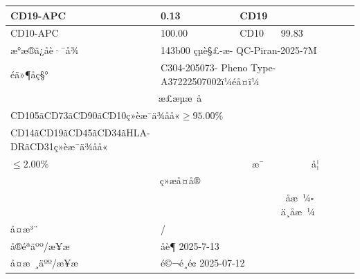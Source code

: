 \documentclass[UTF8,10pt,a4paper,fontset=fandol]{ctexart}
\newcommand{\fieldvalue}[1]{#1}
\newcommand{\handwritten}[1]{#1}
\begin{document}
\begin{tabularx}{\textwidth}{|p{}|X|p{}|X|}
\hline
CD19-APC &
\fieldvalue{\handwritten{0.13}} &
CD19 & \\ \hline
CD10-APC &
\fieldvalue{\handwritten{100.00}} &
CD10 &
\fieldvalue{\handwritten{99.83}} \\ \hline
\multicolumn{1}{|l|}{æ°æ®ä¿å­è·¯å¾} &
\multicolumn{3}{l|}{
\fieldvalue{\handwritten{143b00 çµè§£-æ- QC-Piran-2025-7M}}
} \\ \hline
\multicolumn{1}{|l|}{éä»¶åç§°} &
\multicolumn{3}{l|}{
\fieldvalue{\handwritten{C304-205073- Pheno Type-A37222507002ï¼éå¤ï¼}}
} \\ \hline
\multicolumn{4}{|c|}{æ£æµæ å} \\ \hline
\multicolumn{4}{|l|}{CD105ãCD73ãCD90ãCD10ç»èæ¯ä¾åå«$\geq 95.00\%$} \\ \hline
\multicolumn{2}{|l|}{CD14ãCD19ãCD45ãCD34ãHLA-DRãCD31ç»èæ¯ä¾åå«}\\
\multicolumn{2}{l|}{$\leq 2.00\%$} &
\multicolumn{1}{c|}{
\fieldvalue{\handwritten{\checkmark\ æ¯}}
} &
\multicolumn{1}{c|}{å¦} \\ \hline
\multicolumn{4}{|c|}{ç»æå¤å®} \\ \hline
\multicolumn{3}{|l|}{} &
\fieldvalue{\handwritten{\checkmark\ åæ ¼}}\quad $\square$ ä¸åæ ¼ \\ \hline
å¤æ³¨ &
\multicolumn{3}{l|}{
\fieldvalue{\handwritten{/}}
} \\ \hline
å®éªäºº/æ¥æ &
\multicolumn{3}{l|}{
\fieldvalue{\handwritten{å­è¶ 2025-7-13}}
} \\ \hline
å¤æ ¸äºº/æ¥æ &
\multicolumn{3}{l|}{
\fieldvalue{\handwritten{é©¬é¸é¢ 2025-07-12}}
} \\ \hline
\end{tabularx}
\end{document}
